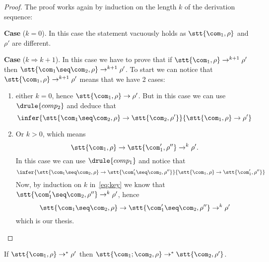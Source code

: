 \begin{proof}
  The proof works again by induction on the length \(k\) of the
  derivation sequence:

  \medskip

  \noindent
  \textbf{Case} (\(k=0\)). In this case the statement vacuously holds
  as \(\stt{\com_1, \rho}\) and \(\rho'\) are different.

  \medskip

  \noindent
  \textbf{Case} (\(k \Rightarrow k + 1\)). In this case we have to
  prove that if \(\stt{\com_1, \rho} \to^{k+1} \rho'\) then
  \(\stt{\com_1\seq\com_2, \rho} \to^{k+1} \rho'\). To start we can
  notice that \(\stt{\com_1, \rho} \to^{k+1} \rho'\) means that we
  have 2 cases:
  \begin{enumerate}[label=(\arabic*)]
  \item either \(k = 0\), hence \(\stt{\com_1, \rho} \to \rho'\). But
    in this case we can use \(\drule{comp_2}\) and deduce that
    \begin{equation*}
      \infer{\stt{\com_1\seq\com_2, \rho} \to \stt{\com_2, \rho'}}{\stt{\com_1, \rho} \to \rho'}
    \end{equation*}
    
  \item Or \(k > 0\), which means
    \begin{equation}\label{eq:key}
      \stt{\com_1, \rho} \to \stt{\com_1', \rho''} \to^k \rho'.
    \end{equation}
    In this case we can use \(\drule{comp_1}\) and notice that
    \begin{equation*}
      \infer{\stt{\com_1\seq\com_2, \rho}\to\stt{\com_1'\seq\com_2, \rho''}}{\stt{\com_1, \rho} \to \stt{\com_1', \rho''}}
    \end{equation*}
    Now, by induction on \(k\) in~\eqref{eq:key} we know that
    \(\stt{\com_1'\seq\com_2, \rho''}\to^k\rho'\), hence
    \begin{equation*}
      \stt{\com_1\seq\com_2, \rho} \to \stt{\com_1'\seq\com_2, \rho''} \to^k \rho'
    \end{equation*}
    which is our thesis.
  \end{enumerate}
\end{proof}

\begin{corollary}\label{co:comp}
  If \(\stt{\com_1, \rho} \to^* \rho'\) then
  \(\stt{\com_1;\com_2, \rho}\to^* \stt{\com_2, \rho'}\).
\end{corollary}

